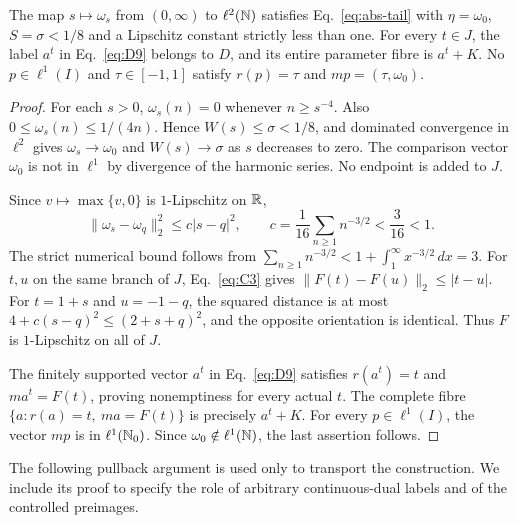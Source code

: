 \begin{lemma}
\label{lem:coordinate-profile}
The map $s\mapsto\omega_s$ from $(0,\infty)$ to $\ell^2(\mathbb N)$
satisfies Eq.~\eqref{eq:abs-tail} with $\eta=\omega_0$, $S=\sigma<1/8$
and a Lipschitz constant strictly less than one. For every $t\in J$,
the label $a^t$ in Eq.~\eqref{eq:D9} belongs to $D$, and its entire
parameter fibre is $a^t+K$. No $p\in\ell^1(I)$ and $\tau\in[-1,1]$
satisfy $r(p)=\tau$ and $mp=(\tau,\omega_0)$.
\end{lemma}
\begin{proof}
\label{sec:C2}
For each $s>0$, $\omega_s(n)=0$ whenever $n\ge s^{-4}$. Also
$0\le\omega_s(n)\le1/(4n)$. Hence $W(s)\le\sigma<1/8$, and dominated
convergence in $\ell^2$ gives $\omega_s\to\omega_0$ and $W(s)\to\sigma$
as $s$ decreases to zero. The comparison vector $\omega_0$ is not in
$\ell^1$ by divergence of the harmonic series. No endpoint is added to $J$.

Since $v\mapsto\max\{v,0\}$ is $1$-Lipschitz on $\mathbb R$,
\begin{equation}
\|\omega_s-\omega_q\|_2^2\le c|s-q|^2,\qquad
c=\frac1{16}\sum_{n\ge1}n^{-3/2}<\frac3{16}<1.
\tag{C3}\label{eq:C3}
\end{equation}
The strict numerical bound follows from
$\sum_{n\ge1}n^{-3/2}<1+\int_1^\infty x^{-3/2}\,dx=3$.
For $t,u$ on the same branch of $J$, Eq.~\eqref{eq:C3} gives
$\|F(t)-F(u)\|_2\le|t-u|$. For $t=1+s$ and $u=-1-q$, the squared
distance is at most $4+c(s-q)^2\le(2+s+q)^2$, and the opposite
orientation is identical. Thus $F$ is $1$-Lipschitz on all of $J$.

The finitely supported vector $a^t$ in Eq.~\eqref{eq:D9} satisfies $r(a^t)=t$ and
$ma^t=F(t)$, proving nonemptiness for every actual $t$. The complete
fibre $\{a:r(a)=t,\ ma=F(t)\}$ is precisely $a^t+K$.
For every $p\in\ell^1(I)$, the vector $mp$ is in $\ell^1(\mathbb N_0)$.
Since $\omega_0\notin\ell^1(\mathbb N)$, the last assertion follows.
\end{proof}

The following pullback argument is used only to transport the construction.
We include its proof to specify the role of arbitrary continuous-dual
labels and of the controlled preimages.

